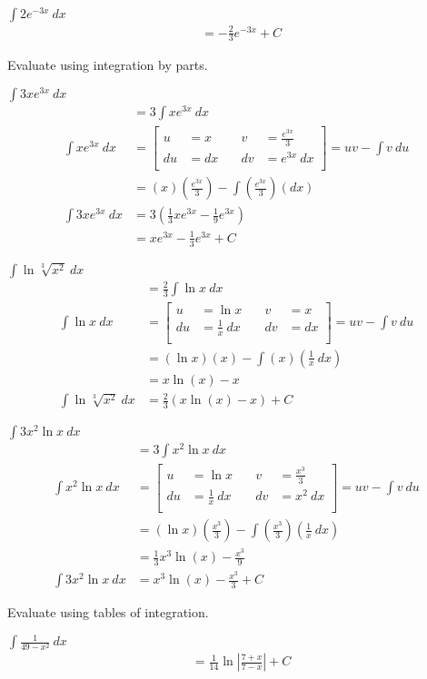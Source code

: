 \documentclass[12pt]{article}
\newenvironment{problem}[2][]{
    \begin{trivlist}
        \item[
            {\bfseries #1}
            {\bfseries #2.}
        ]
}{\end{trivlist}}
\newcommand{\descprob}[1]{\hfill\break #1}
\newcommand{\setuv}[4]{
\left[
\begin{alignedat}{2}
u &= #1 &\quad v &= #3 \\
du &= #2 &\quad dv &= #4 \\
\end{alignedat}
\right]  = uv - \int v ~ du \\
&= \intbp{#1}{#3}{#2}
}
\newcommand{\intbp}[3]{\left(#1\right) \left(#2\right) - \int \left(#2\right) \left(#3\right)}
\begin{document}
\begin{problem}{30}
$\displaystyle\int 2e^{-3x} ~ dx$
\begin{align}
&= - \frac{2}{3} e^{-3x} + C
\end{align}
\end{problem}

\descprob{Evaluate using integration by parts.}

\begin{problem}{31}
$\displaystyle\int 3x e^{3x} ~ dx$
\begin{align}
&= 3 \int x e^{3x} ~ dx \\
\int x e^{3x} ~ dx &= \setuv{x}{dx}{\frac{e^{3x}}{3}}{e^{3x} ~ dx} \\
\int 3x e^{3x} ~ dx &= 3 \left(\frac{1}{3} xe^{3x} - \frac{1}{9} e^{3x}\right) \\
&= xe^{3x} - \frac{1}{3} e^{3x} + C
\end{align}
\end{problem}

\begin{problem}{32}
$\displaystyle\int \ln \sqrt[3]{x^2} ~ dx$
\begin{align}
&= \frac{2}{3} \int \ln x ~ dx \\
\int \ln x ~ dx &= \setuv{\ln x}{\frac{1}{x} ~ dx}{x}{dx} \\
&= x \ln \left(x\right) - x \\
\int \ln \sqrt[3]{x^2} ~ dx &= \frac{2}{3} \left(x \ln \left(x\right) - x\right) + C
\end{align}
\end{problem}

\begin{problem}{33}
$\displaystyle\int 3x^2 \ln x ~ dx$
\begin{align}
&= 3 \int x^2 \ln x ~ dx \\
\int x^{2} \ln x ~ dx &= \setuv{\ln x}{\frac{1}{x} ~ dx}{\frac{x^3}{3}}{x^2 ~ dx} \\
&= \frac{1}{3} x^3 \ln \left(x\right) - \frac{x^3}{9} \\
\int 3x^2 \ln x ~ dx &= x^3 \ln \left(x\right) - \frac{x^3}{3} + C
\end{align}
\end{problem}

\descprob{Evaluate using tables of integration.}

\begin{problem}{34}
$\displaystyle\int \frac{1}{49 - x^2} ~ dx$
\begin{align}
&= \frac{1}{14} \ln \left|\frac{7 + x}{7 - x}\right| + C
\end{align}
\end{problem}
\end{document}
